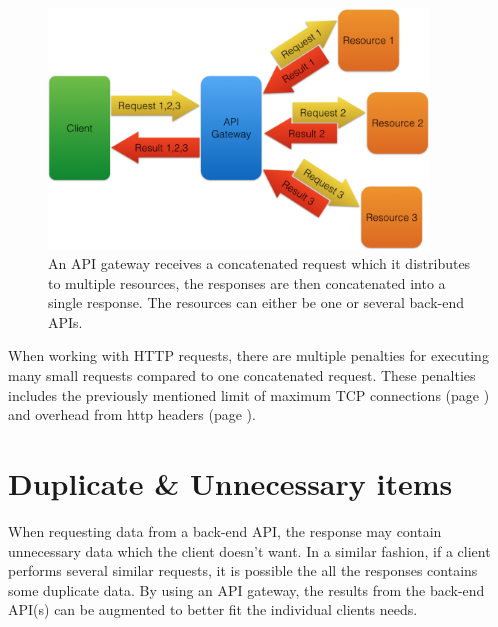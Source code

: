 \documentclass{cslthse-msc}
\begin{document}
\begin{figure}[H]
  \centering
    \begin{center}
      \includegraphics[width=0.9\textwidth]{images/api_gateway_concatenation.png}
    \end{center}
  \caption{An API gateway receives a concatenated request which it distributes to multiple resources, the responses are then concatenated into a single response. The resources can either be one or several back-end APIs.}
\end{figure}

When working with HTTP requests, there are multiple penalties for executing many small requests compared to one concatenated request. These penalties includes the previously mentioned limit of maximum TCP connections (page \pageref{max_tcp}) and overhead from http headers (page \pageref{headers}).

\section{Duplicate \& Unnecessary items}
When requesting data from a back-end API, the response may contain unnecessary data which the client doesn't want. In a similar fashion, if a client performs several similar requests, it is possible the all the responses contains some duplicate data. By using an API gateway, the results from the back-end API(s) can be augmented to better fit the individual clients needs.
\end{document}
